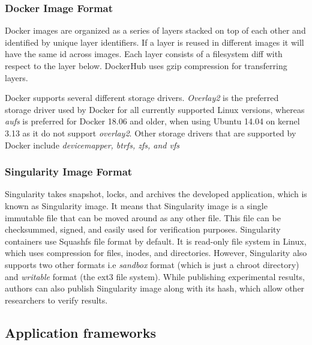 \documentclass[a4paper,num-refs]{oup-contemporary}
\begin{document}
\subsubsection{Docker Image Format}

Docker images are organized as a series of layers stacked on top of each
other and identified by unique layer identifiers. If a layer is reused
in different images it will
have the same id across images. Each layer consists of a filesystem diff
with respect to the layer below. DockerHub uses gzip compression for
transferring layers.  Docker supports several different storage drivers.
\textit{Overlay2} is the preferred storage driver used by Docker for all currently
supported Linux versions, whereas \textit{aufs} is preferred for Docker 18.06 and
older, when using Ubuntu 14.04 on kernel 3.13 as it do not support \textit{overlay2}.
Other storage drivers that are supported by Docker include \textit{devicemapper, btrfs,
zfs, and vfs}

\subsubsection{Singularity Image Format}

Singularity takes snapshot, locks, and archives the developed application,
which is known as Singularity image.
It means that Singularity image is a single immutable file that can be moved around as
any other file. This file can be checksummed, signed, and easily
used for verification purposes. Singularity containers use Squashfs file format
by default. It is read-only file system in Linux, which uses compression for files,
inodes, and directories. However, Singularity also supports two other 
formats i.e \textit{sandbox} format
(which is just a chroot
directory) and \textit{writable} format (the ext3 file system).
While publishing experimental results, authors can also publish Singularity
image along with its hash, which allow other researchers to verify results.

\subsection{Application frameworks}
\end{document}
